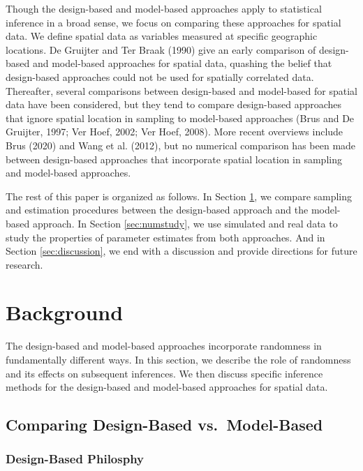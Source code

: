 \documentclass[]{elsarticle} %
\begin{document}
Though the design-based and model-based approaches apply to statistical
inference in a broad sense, we focus on comparing these approaches for
spatial data. We define spatial data as variables measured at specific
geographic locations. De Gruijter and Ter Braak (1990) give an early
comparison of design-based and model-based approaches for spatial data,
quashing the belief that design-based approaches could not be used for
spatially correlated data. Thereafter, several comparisons between
design-based and model-based for spatial data have been considered, but
they tend to compare design-based approaches that ignore spatial
location in sampling to model-based approaches (Brus and De Gruijter,
1997; Ver Hoef, 2002; Ver Hoef, 2008). More recent overviews include
Brus (2020) and Wang et al. (2012), but no numerical comparison has been
made between design-based approaches that incorporate spatial location
in sampling and model-based approaches.

The rest of this paper is organized as follows. In Section
\ref{sec:background}, we compare sampling and estimation procedures
between the design-based approach and the model-based approach. In
Section \ref{sec:numstudy}, we use simulated and real data to study the
properties of parameter estimates from both approaches. And in Section
\ref{sec:discussion}, we end with a discussion and provide directions
for future research.

\hypertarget{sec:background}{%
\section{Background}\label{sec:background}}

The design-based and model-based approaches incorporate randomness in
fundamentally different ways. In this section, we describe the role of
randomness and its effects on subsequent inferences. We then discuss
specific inference methods for the design-based and model-based
approaches for spatial data.

\hypertarget{comparing-design-based-vs.-model-based}{%
\subsection{Comparing Design-Based
vs.~Model-Based}\label{comparing-design-based-vs.-model-based}}

\hypertarget{design-based-philosphy}{%
\subsubsection{Design-Based Philosphy}\label{design-based-philosphy}}
\end{document}
